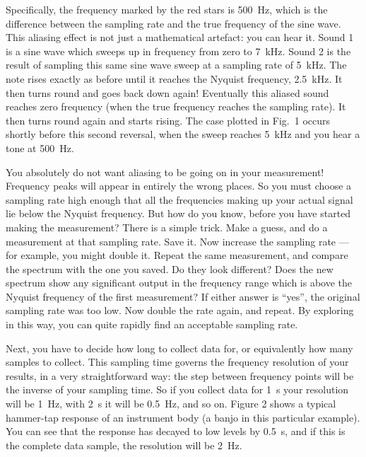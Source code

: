 
  Specifically, the frequency marked by the red stars is 500~Hz, which is the 
  difference between the sampling rate and the true frequency of the sine wave. 
  This aliasing effect is not just a mathematical artefact: you can hear it. 
  Sound 1 is a sine wave which sweeps up in frequency from zero to 7~kHz. Sound 
  2 is the result of sampling this same sine wave sweep at a sampling rate of 
  5~kHz. The note rises exactly as before until it reaches the Nyquist 
  frequency, 2.5~kHz. It then turns round and goes back down again! Eventually 
  this aliased sound reaches zero frequency (when the true frequency reaches 
  the sampling rate). It then turns round again and starts rising. The case 
  plotted in Fig.\ 1 occurs shortly before this second reversal, when the sweep 
  reaches 5~kHz and you hear a tone at 500~Hz. 

  You absolutely do not want aliasing to be going on in your measurement! 
  Frequency peaks will appear in entirely the wrong places. So you must choose 
  a sampling rate high enough that all the frequencies making up your actual 
  signal lie below the Nyquist frequency. But how do you know, before you have 
  started making the measurement? There is a simple trick. Make a guess, and do 
  a measurement at that sampling rate. Save it. Now increase the sampling rate 
  — for example, you might double it. Repeat the same measurement, and compare 
  the spectrum with the one you saved. Do they look different? Does the new 
  spectrum show any significant output in the frequency range which is above 
  the Nyquist frequency of the first measurement? If either answer is “yes”, 
  the original sampling rate was too low. Now double the rate again, and 
  repeat. By exploring in this way, you can quite rapidly find an acceptable 
  sampling rate. 

  Next, you have to decide how long to collect data for, or equivalently how 
  many samples to collect. This sampling time governs the frequency resolution 
  of your results, in a very straightforward way: the step between frequency 
  points will be the inverse of your sampling time. So if you collect data for 
  1~s your resolution will be 1~Hz, with 2~s it will be 0.5~Hz, and so on. 
  Figure 2 shows a typical hammer-tap response of an instrument body (a banjo 
  in this particular example). You can see that the response has decayed to low 
  levels by 0.5~s, and if this is the complete data sample, the resolution will 
  be 2~Hz. 

